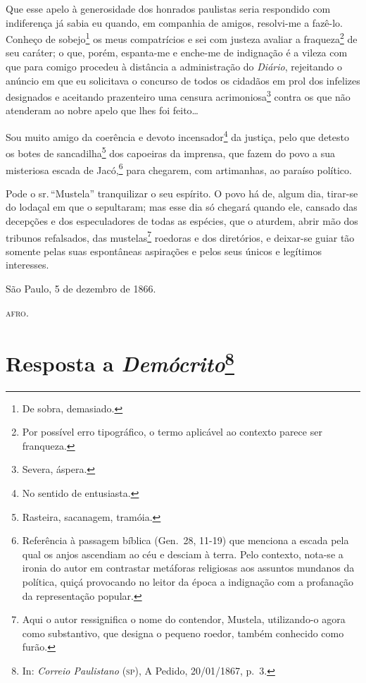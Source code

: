 Que esse apelo à generosidade dos honrados paulistas seria respondido
com indiferença já sabia eu quando, em companhia de amigos, resolvi-me a
fazê-lo. Conheço de sobejo\footnote{De sobra, demasiado.} os meus
compatrícios e sei com justeza avaliar a fraqueza\footnote{Por
  possível erro tipográfico, o termo aplicável ao contexto parece ser
  franqueza.} de seu caráter; o que, porém, espanta-me e enche-me de
indignação é a vileza com que para comigo procedeu à distância a
administração do \emph{Diário}, rejeitando o anúncio em que eu
solicitava o concurso de todos os cidadãos em prol dos infelizes
designados e aceitando prazenteiro uma censura acrimoniosa\footnote{
  Severa, áspera.} contra os que não atenderam ao nobre apelo que lhes
foi feito\ldots{}

Sou muito amigo da coerência e devoto incensador\footnote{No sentido
  de entusiasta.} da justiça, pelo que detesto os botes de
sancadilha\footnote{Rasteira, sacanagem, tramóia.} dos capoeiras da
imprensa, que fazem do povo a sua misteriosa escada de Jacó,\footnote{
  Referência à passagem bíblica (Gen.~28, 11-19) que menciona a escada
  pela qual os anjos ascendiam ao céu e desciam à terra. Pelo contexto,
  nota-se a ironia do autor em contrastar metáforas religiosas aos
  assuntos mundanos da política, quiçá provocando no leitor da época a
  indignação com a profanação da representação popular.} para chegarem,
com artimanhas, ao paraíso político.

Pode o sr.\,``Mustela'' tranquilizar o seu espírito. O povo há de, algum
dia, tirar-se do lodaçal em que o sepultaram; mas esse dia só chegará
quando ele, cansado das decepções e dos especuladores de todas as
espécies, que o aturdem, abrir mão dos tribunos refalsados, das
mustelas\footnote{Aqui o autor ressignifica o nome do contendor,
  Mustela, utilizando-o agora como substantivo, que designa o pequeno
  roedor, também conhecido como furão.} roedoras e dos diretórios, e
deixar-se guiar tão somente pelas suas espontâneas aspirações e pelos
seus únicos e legítimos interesses.
\begin{flushright}
São Paulo, 5 de dezembro de 1866.

\textsc{afro}.
\end{flushright}
\chapter{Resposta a \emph{Demócrito}\footnote{In: \emph{Correio
  Paulistano} (\textsc{sp}), A Pedido, 20/01/1867, p.~3.}}

